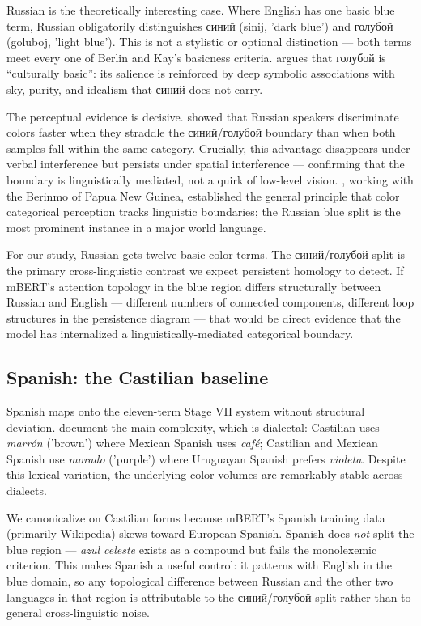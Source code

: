 Russian is the theoretically interesting case. Where English has one basic blue term, Russian obligatorily distinguishes синий (sinij, 'dark blue') and голубой (goluboj, 'light blue'). This is not a stylistic or optional distinction --- both terms meet every one of Berlin and Kay's basicness criteria. \textcite{paramei2005} argues that голубой is ``culturally basic'': its salience is reinforced by deep symbolic associations with sky, purity, and idealism that синий does not carry.

The perceptual evidence is decisive. \textcite{winawer2007} showed that Russian speakers discriminate colors faster when they straddle the синий/голубой boundary than when both samples fall within the same category. Crucially, this advantage disappears under verbal interference but persists under spatial interference --- confirming that the boundary is linguistically mediated, not a quirk of low-level vision. \textcite{davidoff1999}, working with the Berinmo of Papua New Guinea, established the general principle that color categorical perception tracks linguistic boundaries; the Russian blue split is the most prominent instance in a major world language.

For our study, Russian gets twelve basic color terms. The синий/голубой split is the primary cross-linguistic contrast we expect persistent homology to detect. If mBERT's attention topology in the blue region differs structurally between Russian and English --- different numbers of connected components, different loop structures in the persistence diagram --- that would be direct evidence that the model has internalized a linguistically-mediated categorical boundary.

\subsection{Spanish: the Castilian baseline}
\label{sec:spanish-color}

Spanish maps onto the eleven-term Stage VII system without structural deviation. \textcite{lillo2018} document the main complexity, which is dialectal: Castilian uses \emph{marrón} ('brown') where Mexican Spanish uses \emph{café}; Castilian and Mexican Spanish use \emph{morado} ('purple') where Uruguayan Spanish prefers \emph{violeta}. Despite this lexical variation, the underlying color volumes are remarkably stable across dialects.

We canonicalize on Castilian forms because mBERT's Spanish training data (primarily Wikipedia) skews toward European Spanish. Spanish does \emph{not} split the blue region --- \emph{azul celeste} exists as a compound but fails the monolexemic criterion. This makes Spanish a useful control: it patterns with English in the blue domain, so any topological difference between Russian and the other two languages in that region is attributable to the синий/голубой split rather than to general cross-linguistic noise.

